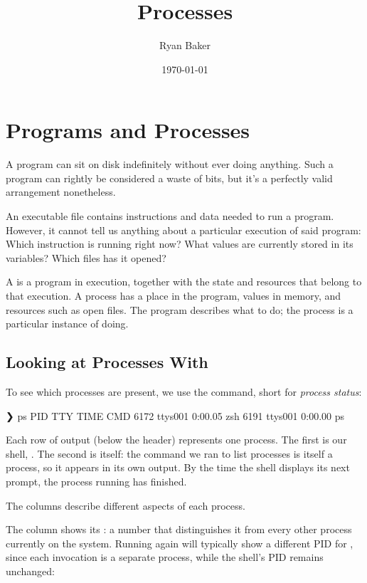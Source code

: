 \documentclass[11pt]{article}
\title{Processes}
\author{Ryan Baker}
\date{\today}
\begin{document}
\maketitle
\clearpage
\tableofcontents
\clearpage

\section{Programs and Processes}

A program can sit on disk indefinitely without ever doing anything.
Such a program can rightly be considered a waste of bits, but it's a perfectly valid arrangement nonetheless.

An executable file contains instructions and data needed to run a program.
However, it cannot tell us anything about a particular execution of said program:
Which instruction is running right now?
What values are currently stored in its variables?
Which files has it opened?

A  is a program in execution, together with the state and resources that belong to that execution.
A process has a place in the program, values in memory, and resources such as open files.
The program describes what to do; the process is a particular instance of doing.

\subsection{Looking at Processes With }

To see which processes are present, we use the  command, short for \emph{process status}:

\begin{terminal}[unbreakable]
❯ ps
  PID TTY           TIME CMD
 6172 ttys001    0:00.05 zsh
 6191 ttys001    0:00.00 ps
\end{terminal}

Each row of output (below the header) represents one process.
The first is our shell, .
The second is  itself: the command we ran to list processes is itself a process, so it appears in its own output.
By the time the shell displays its next prompt, the process running  has finished.

The columns describe different aspects of each process.

The  column shows its : a number that distinguishes it from every other process currently on the system.
Running  again will typically show a different PID for , since each invocation is a separate process, while the shell's PID remains unchanged:
\end{document}

